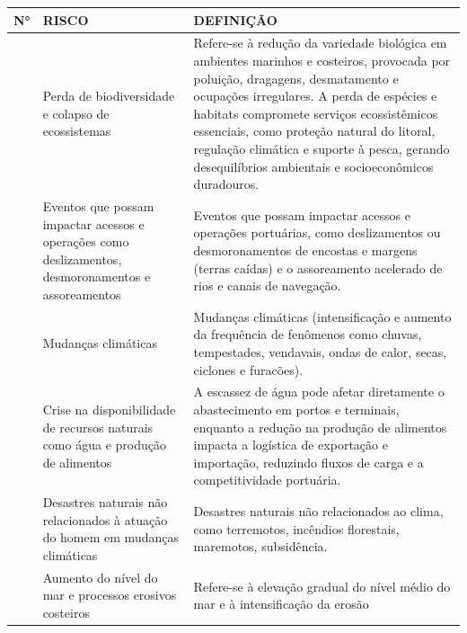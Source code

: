 \documentclass[
  portuguese,
  letterpaper,
  DIV=11,
  numbers=noendperiod]{scrreprt}
\begin{document}
\begin{longtable}[]{@{}
  >{\raggedright\arraybackslash}p{}
  >{\raggedright\arraybackslash}p{}
  >{\raggedright\arraybackslash}p{}@{}}
\toprule\noalign{}
\begin{minipage}[b]{\linewidth}\raggedright
N°
\end{minipage} & \begin{minipage}[b]{\linewidth}\raggedright
RISCO
\end{minipage} & \begin{minipage}[b]{\linewidth}\raggedright
DEFINIÇÃO
\end{minipage} \\
\midrule\noalign{}
\endhead
\bottomrule\noalign{}
\endlastfoot
1 & Perda de biodiversidade e colapso de ecossistemas & Refere-se à
redução da variedade biológica em ambientes marinhos e costeiros,
provocada por poluição, dragagens, desmatamento e ocupações irregulares.
A perda de espécies e habitats compromete serviços ecossistêmicos
essenciais, como proteção natural do litoral, regulação climática e
suporte à pesca, gerando desequilíbrios ambientais e socioeconômicos
duradouros. \\
2 & Eventos que possam impactar acessos e operações como deslizamentos,
desmoronamentos e assoreamentos & Eventos que possam impactar acessos e
operações portuárias, como deslizamentos ou desmoronamentos de encostas
e margens (terras caídas) e o assoreamento acelerado de rios e canais de
navegação. \\
3 & Mudanças climáticas & Mudanças climáticas (intensificação e aumento
da frequência de fenômenos como chuvas, tempestades, vendavais, ondas de
calor, secas, ciclones e furacões). \\
4 & Crise na disponibilidade de recursos naturais como água e produção
de alimentos & A escassez de água pode afetar diretamente o
abastecimento em portos e terminais, enquanto a redução na produção de
alimentos impacta a logística de exportação e importação, reduzindo
fluxos de carga e a competitividade portuária. \\
5 & Desastres naturais não relacionados à atuação do homem em mudanças
climáticas & Desastres naturais não relacionados ao clima, como
terremotos, incêndios florestais, maremotos, subsidência. \\
6 & Aumento do nível do mar e processos erosivos costeiros & Refere-se à
elevação gradual do nível médio do mar e à intensificação da erosão

\end{longtable}
\end{document}
